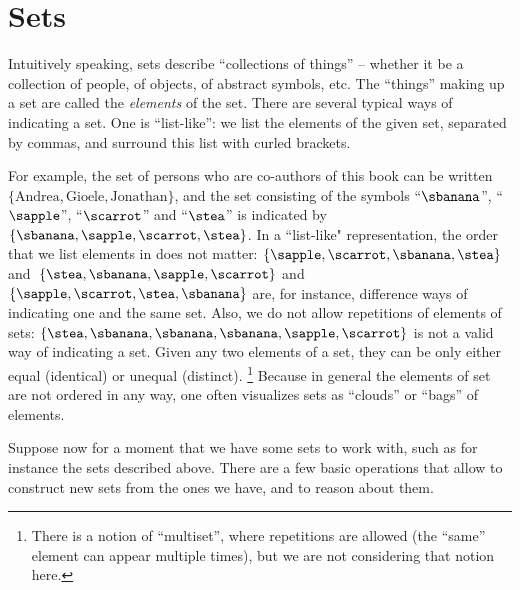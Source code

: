 
\section{Sets}

Intuitively speaking, sets describe ``collections of things'' -- whether it be a collection of people, of objects, of abstract symbols, etc.
The ``things'' making up a set are called the \emph{elements} of the set.
There are several typical ways of indicating a set.
One is ``list-like'': we list the elements of the given set, separated by commas, and surround this list with curled brackets.


For example, the set of persons who are co-authors of this book can be written~$\{ \text{Andrea}, \text{Gioele}, \text{Jonathan} \}$, and the set consisting of the symbols ``$\sbanana$'', ``$\sapple$'', ``$\scarrot$'' and ``$\stea$'' is indicated by $\{ \sbanana, \sapple, \scarrot, \stea \}$.
In a ``list-like" representation, the order that we list elements in does not matter:
$\{ \sapple, \scarrot, \sbanana, \stea \}$ and~$\{ \stea, \sbanana, \sapple, \scarrot\}$ and~$\{ \sapple, \scarrot, \stea, \sbanana \}$ are, for instance, difference ways of indicating one and the same set.
Also, we do not allow repetitions of elements of sets:
$\{ \stea, \sbanana, \sbanana, \sbanana, \sapple, \scarrot \}$ is not a valid way of indicating a set.
Given any two elements of a set, they can be only either equal (identical) or unequal (distinct).
\footnote{There is a notion of ``multiset'', where repetitions are allowed (the ``same'' element can appear multiple times), but we are not considering that notion here.}
Because in general the elements of set are not ordered in any way, one often visualizes sets as ``clouds'' or ``bags'' of elements.


Suppose now for a moment that we have some sets to work with, such as for instance the sets described above.
There are a few basic operations that allow to construct new sets from the ones we have, and to reason about them.


